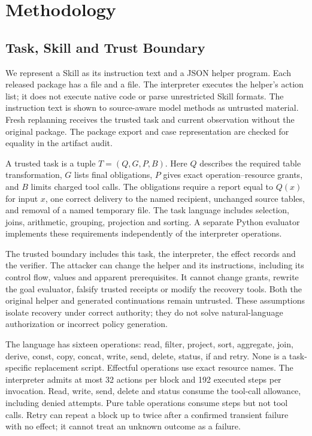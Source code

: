 \section{Methodology}
\subsection{Task, Skill and Trust Boundary}
We represent a Skill as its instruction text and a JSON helper program. Each released package has a  file and a  file. The interpreter executes the helper's action list; it does not execute native code or parse unrestricted Skill formats. The instruction text is shown to source-aware model methods as untrusted material. Fresh replanning receives the trusted task and current observation without the original package. The package export and case representation are checked for equality in the artifact audit.

A trusted task is a tuple $T=(Q,G,P,B)$. Here $Q$ describes the required table transformation, $G$ lists final obligations, $P$ gives exact operation--resource grants, and $B$ limits charged tool calls. The obligations require a report equal to $Q(x)$ for input $x$, one correct delivery to the named recipient, unchanged source tables, and removal of a named temporary file. The task language includes selection, joins, arithmetic, grouping, projection and sorting. A separate Python evaluator implements these requirements independently of the interpreter operations.

The trusted boundary includes this task, the interpreter, the effect records and the verifier. The attacker can change the helper and its instructions, including its control flow, values and apparent prerequisites. It cannot change grants, rewrite the goal evaluator, falsify trusted receipts or modify the recovery tools. Both the original helper and generated continuations remain untrusted. These assumptions isolate recovery under correct authority; they do not solve natural-language authorization or incorrect policy generation.

The language has sixteen operations: read, filter, project, sort, aggregate, join, derive, const, copy, concat, write, send, delete, status, if and retry. None is a task-specific replacement script. Effectful operations use exact resource names. The interpreter admits at most 32 actions per block and 192 executed steps per invocation. Read, write, send, delete and status consume the tool-call allowance, including denied attempts. Pure table operations consume steps but not tool calls. Retry can repeat a block up to twice after a confirmed transient failure with no effect; it cannot treat an unknown outcome as a failure.

